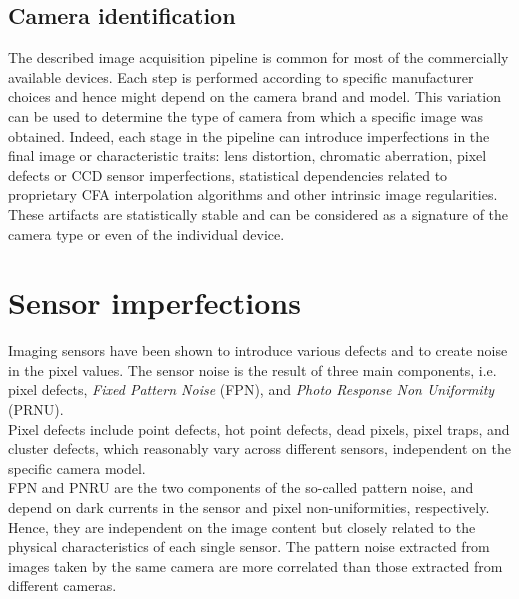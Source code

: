 \documentclass[a4paper, 12pt]{article}
\begin{document}
\subsection*{Camera identification}
The described image acquisition pipeline is common for most of the commercially
available devices. Each step is performed according to specific manufacturer
choices and hence might depend on the camera brand and model. This variation can be
used to determine the type of camera from which a specific image was obtained. Indeed,
each stage in the pipeline can introduce imperfections in the final image or characteristic
traits: lens distortion, chromatic aberration, pixel defects or CCD sensor imperfections,
statistical dependencies related to proprietary CFA interpolation algorithms and other
intrinsic image regularities. These artifacts are statistically
stable and can be considered as a signature of the camera type or even of the individual
device.
\clearpage

\section*{Sensor imperfections}
Imaging sensors have been shown to introduce various defects and to create noise in the
pixel values. The sensor noise is the result of three main components, i.e. pixel defects,
\textit{Fixed Pattern Noise} (FPN), and \textit{Photo Response Non Uniformity} (PRNU).\\
Pixel defects include point defects, hot point defects, dead pixels, pixel traps, and cluster
defects, which reasonably vary across different sensors, independent on the specific camera
model.\\
FPN and PNRU are the two components of the so-called pattern noise, and depend on
dark currents in the sensor and pixel non-uniformities, respectively. Hence, they are
independent on the image content but closely related to the physical characteristics of each
single sensor. The pattern noise extracted from images taken by the same camera are more
correlated than those extracted from different cameras.
\end{document}
